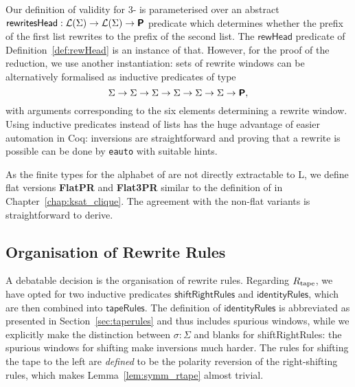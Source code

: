 Our definition of validity for 3-\PR{} is parameterised over an abstract $\textsf{rewritesHead} : \mathcal{L} (\Sigma) \rightarrow \mathcal{L} (\Sigma) \rightarrow \textsf{\bfseries P}$ predicate which determines whether the prefix of the first list rewrites to the prefix of the second list. The $\textsf{rewHead}$ predicate of Definition~\ref{def:rewHead} is an instance of that.
However, for the proof of the reduction, we use another instantiation: sets of rewrite windows can be alternatively formalised as inductive predicates of type
\[ \Sigma \rightarrow \Sigma \rightarrow \Sigma \rightarrow \Sigma \rightarrow \Sigma \rightarrow \Sigma \rightarrow \textsf{\bfseries P}, \]
with arguments corresponding to the six elements determining a rewrite window. 
Using inductive predicates instead of lists has the huge advantage of easier automation in Coq: inversions are straightforward and proving that a rewrite is possible can be done by \texttt{eauto} with suitable hints.

As  the finite types for the alphabet of \PR{} are not directly extractable to L, we define flat versions \textbf{FlatPR} and \textbf{Flat3PR} similar 
to the definition of \FlatClique{} in Chapter~\ref{chap:ksat_clique}.
The agreement with the non-flat variants is straightforward to derive.

\subsection{Organisation of Rewrite Rules}
A debatable decision is the organisation of rewrite rules. Regarding $R_{\text{tape}}$, we have opted for two inductive predicates $\textsf{shiftRightRules}$ and $\textsf{identityRules}$, which are then combined into $\textsf{tapeRules}$. The definition of $\textsf{identityRules}$ is abbreviated as presented in Section~\ref{sec:taperules} and thus includes spurious windows, while we explicitly make the distinction between $\sigma : \Sigma$ and blanks for \textsf{shiftRightRules}: the spurious windows for shifting make inversions much harder. 
The rules for shifting the tape to the left are \emph{defined} to be the polarity reversion of the right-shifting rules, which makes Lemma~\ref{lem:symm_rtape} almost trivial.

